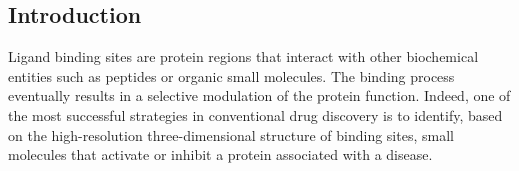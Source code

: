 \subsection{Introduction}

Ligand binding sites are protein regions that interact with other biochemical entities such as peptides or organic small molecules. The binding process eventually results in a selective modulation of the protein function. Indeed, one of the most successful strategies in conventional drug discovery is to identify, based on the high-resolution three-dimensional structure of binding sites, small molecules that activate or inhibit a protein associated with a disease\cite{sadybekov_computational_2023}.

